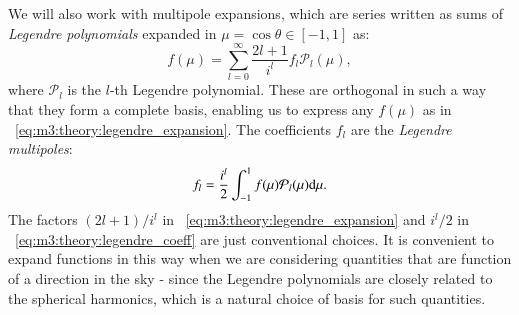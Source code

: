     We will also work with multipole expansions, which are series written as sums of \textit{Legendre polynomials} expanded in $\mu=\cos{\theta}\in[-1,1]$ as:
    \begin{equation}\label{eq:m3:theory:legendre_expansion}
        f(\mu) = \sum_{l=0}^{\infty}\frac{2l+1}{i^l}f_l\mathcal{P}_l(\mu),
    \end{equation}
    where $\mathcal{P}_l$ is the $l$-th Legendre polynomial. These are orthogonal in such a way that they form a complete basis, enabling us to express any $f(\mu)$ as in ~\cref{eq:m3:theory:legendre_expansion}. The coefficients $f_l$ are the \textit{Legendre multipoles}:
    \begin{equation}\label{eq:m3:theory:legendre_coeff}
        f_l = \frac{i^l}{2}\int_{-1}^1f(\mu)\mathcal{P}_l(\mu)\mathrm{d}\mu.
    \end{equation}
    The factors $(2l+1)/i^l$ in ~\cref{eq:m3:theory:legendre_expansion} and $i^l/2$ in ~\cref{eq:m3:theory:legendre_coeff} are just conventional choices. It is convenient to expand functions in this way when we are considering quantities that are function of a direction in the sky - since the Legendre polynomials are closely related to the spherical harmonics, which is a natural choice of basis for such quantities. 




